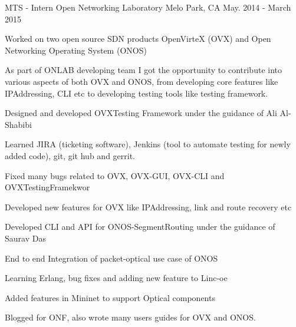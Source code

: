 \begin{cventries}
  \cventry
    {MTS - Intern} %
    {Open Networking Laboratory} %
    {Melo Park, CA} %
    {May. 2014 - March 2015} %
    {
      \begin{cvitems} %
        \item {Worked on two open source SDN products OpenVirteX (OVX) and Open Networking Operating System (ONOS)}
        \item {As part of ONLAB developing team I got the opportunity to contribute into various aspects of both OVX and 
            	ONOS, from developing core features like IPAddressing, CLI etc to developing testing tools 
                like testing framework.}
        \item {Designed and developed OVXTesting Framework under the guidance of Ali Al-Shabibi}
        \item {Learned JIRA (ticketing software), Jenkins (tool to automate testing for newly added code), git, git hub and gerrit.}
        \item {Fixed many bugs related to OVX, OVX-GUI, OVX-CLI and OVXTestingFramekwor}
        \item {Developed new features for OVX like IPAddressing, link and route recovery etc}
        \item {Developed CLI and API for ONOS-SegmentRouting under the guidance of Saurav Das}
        \item {End to end Integration of packet-optical use case of ONOS}
        \item {Learning Erlang, bug fixes and adding new feature to Linc-oe}
        \item {Added features in Mininet to support Optical components}
        \item {Blogged for ONF, also wrote many users guides for OVX and ONOS.}
      \end{cvitems}
    }

\end{cventries}
